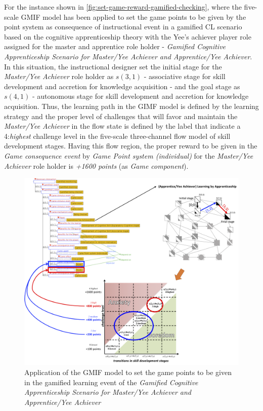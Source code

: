 For the instance shown in \autoref{fig:set-game-reward-gamified-checking}, where the five-scale GMIF model has been applied to set the game points to be given by the point system as consequence of instructional event  in a gamified CL scenario based on the cognitive apprenticeship theory with the Yee's achiever player role assigned for the master and apprentice role holder - \emph{Gamified Cognitive Apprenticeship Scenario for Master/Yee Achiever and Apprentice/Yee Achiever}. In this situation, the instructional designer set the initial stage for the \emph{Master/Yee Achiever} role holder as $s(3,1)$ - associative stage for skill development and accretion for knowledge acquisition - and the goal stage as $s(4,1)$ - autonomous stage for skill development and accretion for knowledge acquisition. Thus, the learning path in the GIMF model is defined by the learning strategy  and the proper level of challenges that will favor and maintain the \emph{Master/Yee Achiever} in the flow state is defined by the label \aspas{$[4;4]$} that indicate a 4:\emph{highest} challenge level in the five-scale three-channel flow model of skill development stages. Having this flow region, the proper reward to be given in the \emph{Game consequence event} by \emph{Game Point system (individual)} for the \emph{Master/Yee Achiever} role holder is \emph{+1600 points} (as \emph{Game component}).

\begin{figure}[htb]
 \caption{Application of the GMIF model to set the game points to be given in the gamified learning event  of the \emph{Gamified Cognitive Apprenticeship Scenario for Master/Yee Achiever and Apprentice/Yee Achiever}}
 \label{fig:set-game-reward-gamified-being-checked}
 \centering
 \includegraphics[width=1\textwidth]{images/chap-model-gmif/set-game-reward-gamified-being-checked.png}
 \fautor
\end{figure}

